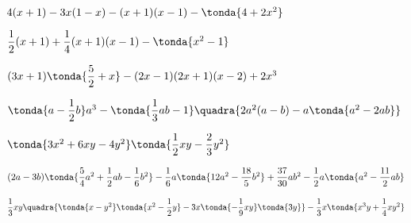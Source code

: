 \begin{esercizio}
\begin{enumeratea}
\item \(4(x+1)-3x(1-x)-(x+1)(x-1)-\tonda{4+2x^{2}}\) 
\item \(\dfrac{1}{2}(x+1)+\dfrac{1}{4}(x+1)(x-1) - \tonda{x^{2}-1}\) 
\item \((3x+1)\tonda{\dfrac{5}{2}+x} - (2x-1)(2x+1)(x-2)+2x^{3}\) 
\\
\item \(\tonda{a-\dfrac{1}{2}b}a^{3} - 
\tonda{\dfrac{1}{3}{ab}-1}\quadra{2a^{2}(a-b) - a\tonda{a^{2}-2{ab}}}\)  
\\
\item \(\tonda{3x^2+6xy-4y^2}\tonda{\dfrac{1}{2}xy - \dfrac{2}{3}y^2}\) 
\item \((2a-3b)\tonda{\dfrac{5}{4}a^{2} + \dfrac{1}{2}{ab} - 
\dfrac{1}{6}b^{2}} - \dfrac{1}{6}a\tonda{12a^{2} - 
\dfrac{18}{5}b^{2}}+\dfrac{37}{30}ab^{2} - \dfrac{1}{2}a\tonda{a^{2} 
-\dfrac{11}{2}{ab}}\) 
\item \(\dfrac{1}{3}xy\quadra{\tonda{x-y^{2}}\tonda{x^{2} -\dfrac{1}{2}y} - 
3x\tonda{-{\dfrac{1}{9}xy}}\tonda{3y}} - \dfrac{1}{3}x\tonda{x^{3}y + 
\dfrac{1}{4}xy^{2}}\) 
\end{enumeratea}
\end{esercizio}
% 
